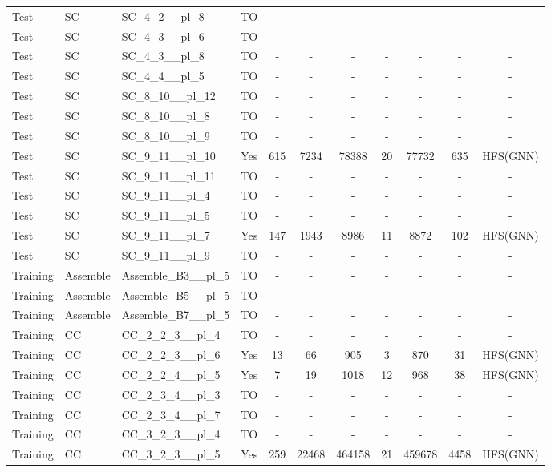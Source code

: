 \documentclass{article}
\begin{document}
\begin{tabular}{lllcccccccc}
Test & SC & SC\_4\_2\_\_pl\_8 & TO & - & - & - & - & - & - & - \\
Test & SC & SC\_4\_3\_\_pl\_6 & TO & - & - & - & - & - & - & - \\
Test & SC & SC\_4\_3\_\_pl\_8 & TO & - & - & - & - & - & - & - \\
Test & SC & SC\_4\_4\_\_pl\_5 & TO & - & - & - & - & - & - & - \\
Test & SC & SC\_8\_10\_\_pl\_12 & TO & - & - & - & - & - & - & - \\
Test & SC & SC\_8\_10\_\_pl\_8 & TO & - & - & - & - & - & - & - \\
Test & SC & SC\_8\_10\_\_pl\_9 & TO & - & - & - & - & - & - & - \\
Test & SC & SC\_9\_11\_\_pl\_10 & Yes & 615 & 7234 & 78388 & 20 & 77732 & 635 & HFS(GNN) \\
Test & SC & SC\_9\_11\_\_pl\_11 & TO & - & - & - & - & - & - & - \\
Test & SC & SC\_9\_11\_\_pl\_4 & TO & - & - & - & - & - & - & - \\
Test & SC & SC\_9\_11\_\_pl\_5 & TO & - & - & - & - & - & - & - \\
Test & SC & SC\_9\_11\_\_pl\_7 & Yes & 147 & 1943 & 8986 & 11 & 8872 & 102 & HFS(GNN) \\
Test & SC & SC\_9\_11\_\_pl\_9 & TO & - & - & - & - & - & - & - \\
Training & Assemble & Assemble\_B3\_\_pl\_5 & TO & - & - & - & - & - & - & - \\
Training & Assemble & Assemble\_B5\_\_pl\_5 & TO & - & - & - & - & - & - & - \\
Training & Assemble & Assemble\_B7\_\_pl\_5 & TO & - & - & - & - & - & - & - \\
Training & CC & CC\_2\_2\_3\_\_pl\_4 & TO & - & - & - & - & - & - & - \\
Training & CC & CC\_2\_2\_3\_\_pl\_6 & Yes & 13 & 66 & 905 & 3 & 870 & 31 & HFS(GNN) \\
Training & CC & CC\_2\_2\_4\_\_pl\_5 & Yes & 7 & 19 & 1018 & 12 & 968 & 38 & HFS(GNN) \\
Training & CC & CC\_2\_3\_4\_\_pl\_3 & TO & - & - & - & - & - & - & - \\
Training & CC & CC\_2\_3\_4\_\_pl\_7 & TO & - & - & - & - & - & - & - \\
Training & CC & CC\_3\_2\_3\_\_pl\_4 & TO & - & - & - & - & - & - & - \\
Training & CC & CC\_3\_2\_3\_\_pl\_5 & Yes & 259 & 22468 & 464158 & 21 & 459678 & 4458 & HFS(GNN) \\

\end{tabular}
\end{document}
